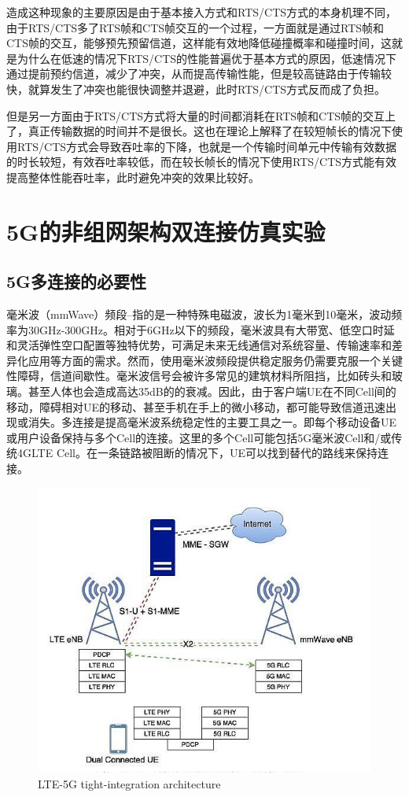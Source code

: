 \documentclass{article}
\begin{document}
造成这种现象的主要原因是由于基本接入方式和RTS/CTS方式的本身机理不同，由于RTS/CTS多了RTS帧和CTS帧交互的一个过程，一方面就是通过RTS帧和CTS帧的交互，能够预先预留信道，这样能有效地降低碰撞概率和碰撞时间，这就是为什么在低速的情况下RTS/CTS的性能普遍优于基本方式的原因，低速情况下通过提前预约信道，减少了冲突，从而提高传输性能，但是较高链路由于传输较快，就算发生了冲突也能很快调整并退避，此时RTS/CTS方式反而成了负担。

但是另一方面由于RTS/CTS方式将大量的时间都消耗在RTS帧和CTS帧的交互上了，真正传输数据的时间并不是很长。这也在理论上解释了在较短帧长的情况下使用RTS/CTS方式会导致吞吐率的下降，也就是一个传输时间单元中传输有效数据的时长较短，有效吞吐率较低，而在较长帧长的情况下使用RTS/CTS方式能有效提高整体性能吞吐率，此时避免冲突的效果比较好。

\section{5G的非组网架构双连接仿真实验}
\subsection{5G多连接的必要性}
毫米波（mmWave）频段--指的是一种特殊电磁波，波长为1毫米到10毫米，波动频率为30GHz-300GHz。相对于6GHz以下的频段，毫米波具有大带宽、低空口时延和灵活弹性空口配置等独特优势，可满足未来无线通信对系统容量、传输速率和差异化应用等方面的需求。然而，使用毫米波频段提供稳定服务仍需要克服一个关键性障碍，信道间歇性。毫米波信号会被许多常见的建筑材料所阻挡，比如砖头和玻璃。甚至人体也会造成高达35dB的的衰减。因此，由于客户端UE在不同Cell间的移动，障碍相对UE的移动、甚至手机在手上的微小移动，都可能导致信道迅速出现或消失。多连接是提高毫米波系统稳定性的主要工具之一。即每个移动设备UE或用户设备保持与多个Cell的连接。这里的多个Cell可能包括5G毫米波Cell和/或传统4GLTE Cell。在一条链路被阻断的情况下，UE可以找到替代的路线来保持连接。
\begin{figure}[ht]
	\centering
	\includegraphics[scale=0.6]{picture/5G-SNA.jpg}
	\caption{LTE-5G tight-integration architecture}
	\label{fig:delay}
\end{figure}
\end{document}
